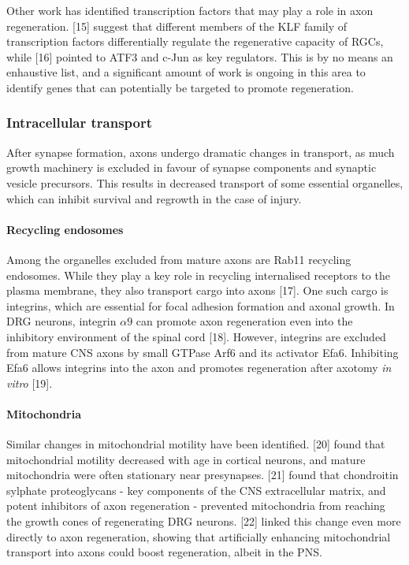 \documentclass[
  12pt,
  a4paper,
]{article}
\begin{document}
Other work has identified transcription factors that may play a role in
axon regeneration. {[}15{]} suggest that different members of the KLF
family of transcription factors differentially regulate the regenerative
capacity of RGCs, while {[}16{]} pointed to ATF3 and c-Jun as key
regulators. This is by no means an enhaustive list, and a significant
amount of work is ongoing in this area to identify genes that can
potentially be targeted to promote regeneration.

\hypertarget{intracellular-transport}{%
\subsubsection{Intracellular transport}\label{intracellular-transport}}

After synapse formation, axons undergo dramatic changes in transport, as
much growth machinery is excluded in favour of synapse components and
synaptic vesicle precursors. This results in decreased transport of some
essential organelles, which can inhibit survival and regrowth in the
case of injury.

\hypertarget{recycling-endosomes}{%
\paragraph{Recycling endosomes}\label{recycling-endosomes}}

Among the organelles excluded from mature axons are Rab11 recycling
endosomes. While they play a key role in recycling internalised
receptors to the plasma membrane, they also transport cargo into axons
{[}17{]}. One such cargo is integrins, which are essential for focal
adhesion formation and axonal growth. In DRG neurons, integrin
\(\alpha9\) can promote axon regeneration even into the inhibitory
environment of the spinal cord {[}18{]}. However, integrins are excluded
from mature CNS axons by small GTPase Arf6 and its activator Efa6.
Inhibiting Efa6 allows integrins into the axon and promotes regeneration
after axotomy \emph{in vitro} {[}19{]}.

\hypertarget{mitochondria}{%
\paragraph{Mitochondria}\label{mitochondria}}

Similar changes in mitochondrial motility have been identified. {[}20{]}
found that mitochondrial motility decreased with age in cortical
neurons, and mature mitochondria were often stationary near presynapses.
{[}21{]} found that chondroitin sylphate proteoglycans - key components
of the CNS extracellular matrix, and potent inhibitors of axon
regeneration - prevented mitochondria from reaching the growth cones of
regenerating DRG neurons. {[}22{]} linked this change even more directly
to axon regeneration, showing that artificially enhancing mitochondrial
transport into axons could boost regeneration, albeit in the PNS.
\end{document}
